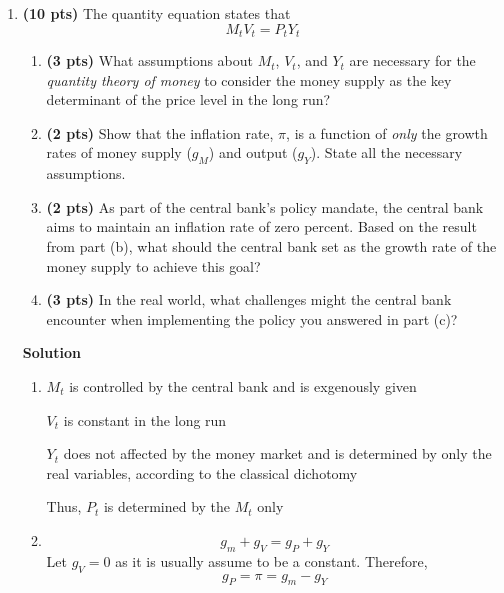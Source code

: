\documentclass[14pt, oneside]{memoir}
\begin{document}
\begin{enumerate}[label=\textbf{\arabic*.}, itemsep=15pt]

\item \textbf{(10  pts)}\label{P1}   The quantity equation states that
\[M_t V_t = P_t Y_t\]


\begin{enumerate}[label=(\alph*)]
	\item \textbf{(3 pts)} 	What assumptions about $M_t$, $V_t$, and $Y_t$ are necessary for the \textit{quantity theory of money} to consider the money supply as the key determinant of the price level in the long run?
	
	\vspace{10cm}
	\item \textbf{(2 pts)} Show that the inflation rate, $\pi$, is a function of \textit{only} the growth rates of money supply ($g_M$) and output ($g_Y$). State all the necessary assumptions. 
	
	\clearpage
	\item \textbf{(2 pts)} As part of the central bank's policy mandate, the central bank aims to maintain an inflation rate of zero percent. Based on the result from part (b), what should the central bank set as the growth rate of the money supply to achieve this goal?
	
	\vspace{6cm}
	\item \textbf{(3 pts)} In the real world, what challenges might the central bank encounter when implementing the policy you answered in part (c)?
	
\end{enumerate}


\vfill

\newpage
\textbf{Solution}
\begin{enumerate}[label=(\alph*)]
	\item 	
	$M_t$ is controlled by the central bank and is exgenously given 
	
	$V_t$ is constant in the long run
	
	$Y_t$ does not affected by the money market and is determined by only the real variables, according to the classical dichotomy 
	
	Thus, $P_t$ is determined by the $M_t$ only
	
	\item 
	\[g_m + g_V = g_P + g_Y\]
	Let $g_V = 0$ as it is usually assume to be a constant. Therefore,
	\[g_P = \pi = g_m - g_Y\]
	

\end{enumerate}
\end{enumerate}
\end{document}
